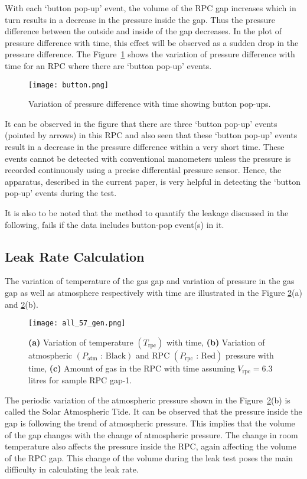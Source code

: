 With each `button pop-up' event, the volume of the RPC gap increases which in turn
results in a decrease in the pressure inside the gap. Thus the pressure
difference between the outside and inside of the gap decreases. In the plot of
pressure difference with time, this effect will be observed as a sudden drop
in the pressure difference. The Figure~\ref{fig:button} shows the variation of
pressure difference with time for an RPC where there are `button pop-up'
events. 
\begin{figure}
  \centering
  \texttt{[image: button.png]}
  \caption{Variation of pressure difference with time showing button pop-ups.}
  \label{fig:button}
\end{figure}
It can be observed in the figure that there are three `button pop-up'
events (pointed by arrows) in this RPC and also seen that these
`button pop-up' events result in a decrease in the pressure difference
within a very short time. These events cannot be detected with
conventional manometers unless the pressure is recorded continuously
using a precise differential pressure sensor. Hence, the apparatus,
described in the current paper, is very helpful in detecting the
`button pop-up' events during the test.

It is also to be noted that the method to quantify the leakage
discussed in the following, fails if the data includes button-pop
event(s) in it.

\subsection{Leak Rate Calculation}\label{sec:calculation}
The variation of temperature of the gas gap and variation of pressure in the
gas gap as well as atmosphere respectively with time are illustrated in the
Figure \ref{fig:temp}(a) and \ref{fig:temp}(b). 
\begin{figure}[h]
  \centering
  \texttt{[image: all\_57\_gen.png]}
  \caption{\textbf{(a)} Variation of temperature $\left(T_{\textrm{rpc}}\right)$
    with time, \textbf{(b)} Variation of atmospheric
    $\left(P_{\textrm{atm}}\text{ : Black}\right)$ and RPC
    $\left(P_{\textrm{rpc}}\text{ : Red}\right)$ pressure with time, \textbf{(c)}
    Amount of gas in the RPC with time assuming $V_{\textrm{rpc}}=6.3$\,litres
    for sample RPC gap-1.}
  \label{fig:temp}
\end{figure}
The periodic variation of the atmospheric pressure shown in the
Figure~\ref{fig:temp}(b) is called the Solar Atmospheric Tide. It can be
observed that the pressure inside the gap is following the trend of atmospheric
pressure. This implies that the volume of the gap changes with the change of
atmospheric pressure. The change in room temperature also affects the pressure
inside the RPC, again affecting the volume of the RPC gap. This change of the
volume during the leak test poses the main difficulty in calculating the leak
rate.

